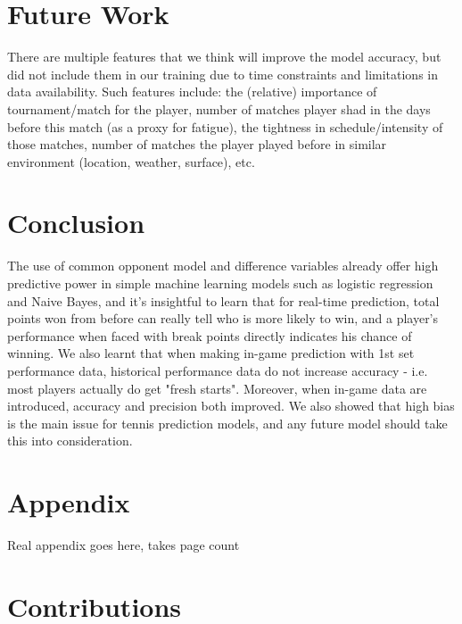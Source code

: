 \documentclass[paper=a4, fontsize=10pt]{scrartcl} %
\numberwithin{equation}{section} %
\numberwithin{figure}{section} %
\numberwithin{table}{section} %
\begin{document}
\section{Future Work}
There are multiple features that we think will improve the model accuracy, but did not include them in our training due to time constraints and limitations in data availability. Such features include: the (relative) importance of tournament/match for the player, number of matches player shad in the days before this match (as a proxy for fatigue), the tightness in schedule/intensity of those matches, number of matches the player played before in similar environment (location, weather, surface), etc.
\section{Conclusion}
The use of common opponent model and difference variables already offer high predictive power in simple machine learning models such as logistic regression and Naive Bayes, and it's insightful to learn that for real-time prediction, total points won from before can really tell who is more likely to win, and a player's performance when faced with break points directly indicates his chance of winning. We also learnt that when making in-game prediction with 1st set performance data, historical performance data do not increase accuracy - i.e. most players actually do get "fresh starts".  Moreover, when in-game data are introduced, accuracy and precision both improved. We also showed that high bias is the main issue for tennis prediction models, and any future model should take this into consideration. 
\section{Appendix}
Real appendix goes here, takes page count

\section{Contributions}
\end{document}
